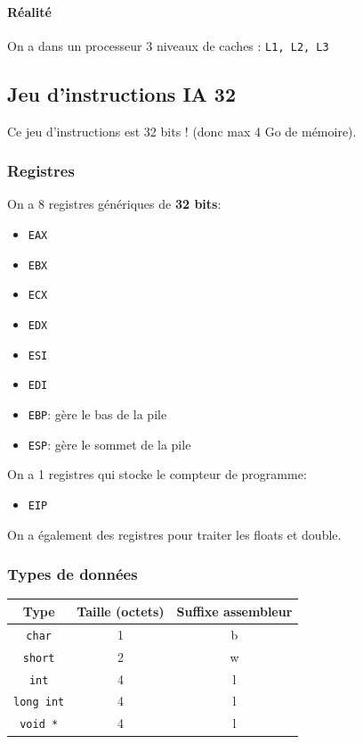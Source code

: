 \paragraph{Réalité}\label{ruxe9alituxe9}

On a dans un processeur 3 niveaux de caches : \texttt{L1,\ L2,\ L3}

\subsection{Jeu d'instructions IA 32}\label{jeu-dinstructions-ia-32}

Ce jeu d'instructions est 32 bits ! (donc max 4 Go de mémoire).

\subsubsection{Registres}\label{registres}

On a 8 registres génériques de \textbf{32 bits}:

\begin{itemize}
\tightlist
\item
  \texttt{EAX}
\item
  \texttt{EBX}
\item
  \texttt{ECX}
\item
  \texttt{EDX}
\item
  \texttt{ESI}
\item
  \texttt{EDI}
\item
  \texttt{EBP}: gère le bas de la pile
\item
  \texttt{ESP}: gère le sommet de la pile
\end{itemize}

On a 1 registres qui stocke le compteur de programme:

\begin{itemize}
\tightlist
\item
  \texttt{EIP}
\end{itemize}

On a également des registres pour traiter les floats et double.

\subsubsection{Types de données}\label{types-de-donnuxe9es}

\begin{longtable}[]{@{}ccc@{}}
\toprule\noalign{}
Type & Taille (octets) & Suffixe assembleur \\
\midrule\noalign{}
\endhead
\bottomrule\noalign{}
\endlastfoot
\texttt{char} & 1 & b \\
\texttt{short} & 2 & w \\
\texttt{int} & 4 & l \\
\texttt{long\ int} & 4 & l \\
\texttt{void\ *} & 4 & l \\
\end{longtable}

